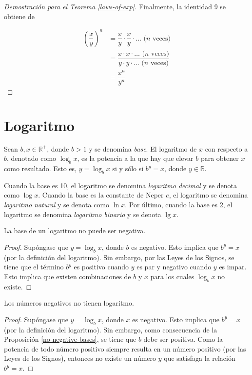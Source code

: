 \begin{proof}[Demostración para el Teorema \ref{laws-of-exp}]
    Finalmente, la identidad 9 se obtiene de
    
    \begin{align*}
        \left(\dfrac{x}{y}\right)^{n} &= \dfrac{x}{y}\cdot\dfrac{x}{y}\cdot\dots\text{ (}n\text{ veces)}\\
        &= \dfrac{x\cdot x\cdot\dots\text{ (}n\text{ veces)}}{y\cdot y\cdot\dots\text{ (}n\text{ veces)}}\\
        &= \dfrac{x^{n}}{y^{n}}
    \end{align*}
\end{proof}

\section{Logaritmo}

Sean $b,x\in\mathbb{R}^{+}$, donde $b>1$ y se denomina \emph{base}.
El logaritmo de $x$ con respecto a $b$, denotado como
$\log_{b}x$, es la potencia a la que hay que elevar $b$ para obtener
$x$ como resultado. Esto es, $y=\log_{b}x$ si y sólo si $b^{y}=x$,
donde $y\in\mathbb{R}$.

Cuando la base es 10, el logaritmo se denomina \emph{logaritmo decimal} y se denota 
como $\log x$. Cuando la base es la constante de Neper $e$, el logaritmo se
denomina \emph{logaritmo natural} y se denota como $\ln x$. Por último, cuando la 
base es 2, el logaritmo se denomina \emph{logaritmo binario} y se denota $\lg x$.

\begin{prop}
    \label{no-negative-bases}La base de un logaritmo no puede ser negativa.
\end{prop}
\begin{proof}
    Supóngase que $y=\log_{b}x$, donde $b$ es negativo. Esto implica
    que $b^{y}=x$ (por la definición del logaritmo). Sin embargo, por
    las Leyes de los Signos, se tiene que el término $b^{y}$ es positivo
    cuando $y$ es par y negativo cuando $y$ es impar. Esto implica que
    existen combinaciones de $b$ y $x$ para los cuales $\log_{b}x$ no existe.
\end{proof}

\begin{prop}
    \label{no-negative-logarithm}Los números negativos no tienen logaritmo.
\end{prop}
\begin{proof}
    Supóngase que $y=\log_{b}x$, donde $x$ es negativo. Esto implica
    que $b^{y}=x$ (por la definición del logaritmo). Sin embargo, como
    consecuencia de la Proposición \ref{no-negative-bases}, se tiene
    que $b$ debe ser positiva. Como la potencia de todo número positivo
    siempre resulta en un número positivo (por las Leyes de los Signos),
    entonces no existe un número $y$ que satisfaga la relación $b^{y}=x$.
\end{proof}



